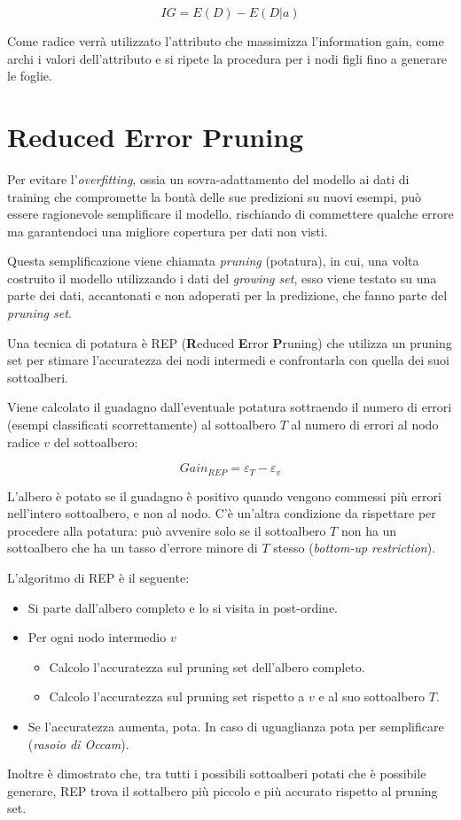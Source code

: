 $$ IG = E(D) - E(D|a) $$

Come radice verrà utilizzato l'attributo che massimizza l'information gain, come archi i valori dell'attributo e si ripete la procedura per i nodi figli fino a generare le foglie.

\section{Reduced Error Pruning}
\label{ss:rep}
Per evitare l'\textit{overfitting}, ossia un sovra-adattamento del modello ai dati di training che compromette la bontà delle sue predizioni su nuovi esempi, può essere ragionevole semplificare il modello, rischiando di commettere qualche errore ma garantendoci una migliore copertura per dati non visti.

Questa semplificazione viene chiamata \textit{pruning} (potatura), in cui, una volta costruito il modello utilizzando i dati del \textit{growing set}, esso viene testato su una parte dei dati, accantonati e non adoperati per la predizione, che fanno parte del \textit{pruning set}.

Una tecnica di potatura è REP (\textbf{R}educed \textbf{E}rror \textbf{P}runing)\cite{Quinlan:1987:SDT:50007.50008} che utilizza un pruning set per stimare l'accuratezza dei nodi intermedi e confrontarla con quella dei suoi sottoalberi.

Viene calcolato il guadagno dall'eventuale potatura sottraendo il numero di errori (esempi classificati scorrettamente) al sottoalbero $T$ al numero di errori al nodo radice $v$ del sottoalbero:

$$ Gain_{REP} = \varepsilon_T - \varepsilon_v $$

L'albero è potato se il guadagno è positivo quando vengono commessi più errori nell'intero sottoalbero, e non al nodo. C'è un'altra condizione da rispettare per procedere alla potatura: può avvenire solo se il sottoalbero $T$ non ha un sottoalbero che ha un tasso d'errore minore di $T$ stesso (\textit{bottom-up restriction}).

L'algoritmo di REP è il seguente:
\begin{itemize}
	\item Si parte dall'albero completo e lo si visita in post-ordine.
	\item Per ogni nodo intermedio $v$
	\begin{itemize}
		\item Calcolo l'accuratezza sul pruning set dell'albero completo.
		\item Calcolo l'accuratezza sul pruning set rispetto a $v$ e al suo sottoalbero $T$.
	\end{itemize}
	\item Se l'accuratezza aumenta, pota. In caso di uguaglianza pota per semplificare (\emph{rasoio di Occam}).
\end{itemize}

Inoltre è dimostrato che, tra tutti i possibili sottoalberi potati che è possibile generare, REP trova il sottalbero più piccolo e più accurato rispetto al pruning set\cite{Esposito:1997:CAM:252862.252878}.